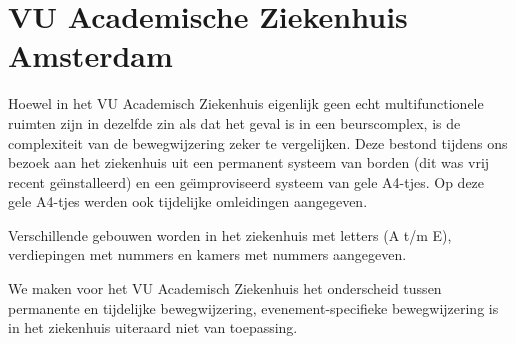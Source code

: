 \section{VU Academische Ziekenhuis Amsterdam}

Hoewel in het VU Academisch Ziekenhuis eigenlijk geen echt multifunctionele ruimten zijn in dezelfde zin als dat het geval is in een beurscomplex, is de complexiteit van de bewegwijzering zeker te vergelijken. Deze bestond tijdens ons bezoek aan het ziekenhuis uit een permanent systeem van borden (dit was vrij recent ge\"\i nstalleerd) en een ge\"\i mproviseerd systeem van gele A4-tjes. Op deze gele A4-tjes werden ook tijdelijke omleidingen aangegeven.

Verschillende gebouwen worden in het ziekenhuis met letters (A t/m E), verdiepingen met nummers en kamers met nummers aangegeven.

We maken voor het VU Academisch Ziekenhuis het onderscheid tussen permanente en tijdelijke bewegwijzering, evenement-specifieke bewegwijzering is in het ziekenhuis uiteraard niet van toepassing.


